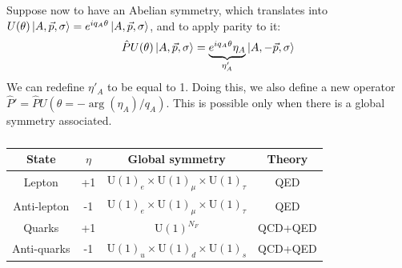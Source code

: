 \documentclass[../main.tex]{subfiles}
\begin{document}
Suppose now to have an Abelian symmetry, which translates into $U(\theta)\ket{A,\Vec{p},\sigma}=e^{iq_A\theta}\ket{A,\Vec{p},\sigma}$, and to apply parity to it:
\[
\hat{P}U(\theta)\ket{A,\Vec{p},\sigma}=\underbrace{e^{iq_A\theta}\eta_A}_{\eta'_A}\ket{A,-\Vec{p},\sigma}
\]
We can redefine $\eta'_A$ to be equal to 1. Doing this, we also define a new operator $\hat{P}'=\hat{P}U(\theta=-\arg(\eta_A)/q_A)$. This is possible only when there is a global symmetry associated.
\begin{table}[h]
    \centering
    \begin{tabular}{c|c|c|c}
    State & $\eta$ & Global symmetry & Theory\\
    \hline
    Lepton & +1 & U$(1)_e\times$U$(1)_\mu\times$U$(1)_\tau$ & QED\\
    Anti-lepton & -1 & U$(1)_e\times$U$(1)_\mu\times$U$(1)_\tau$ & QED\\
    Quarks & +1 & U$(1)^{N_F}$ & QCD+QED\\
    Anti-quarks & -1 & U$(1)_u\times$U$(1)_d\times$U$(1)_s$ & QCD+QED\\
    \hline
    \end{tabular}
    \caption*{}
\end{table}
\end{document}
